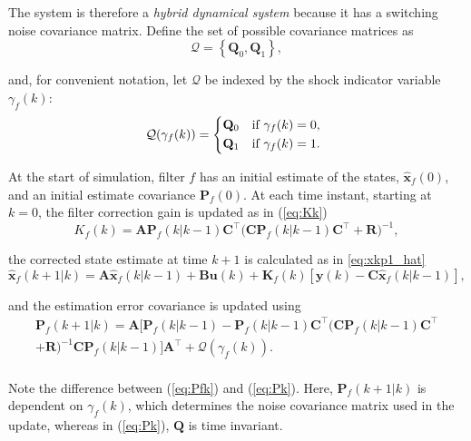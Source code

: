 The system is therefore a \textit{hybrid dynamical system} because it has a switching noise covariance matrix. Define the set of possible covariance matrices as
\begin{equation} \label{eq:init_Q_R}
	\mathcal{Q} = \left\{\mathbf{Q}_0, \mathbf{Q}_1\right\},
\end{equation}

and, for convenient notation, let $\mathcal{Q}$ be indexed by the shock indicator variable $\gamma_f(k)$:
\begin{equation} \label{eq:init_Q}
	\mathcal{Q}(\gamma_f(k)) = 
	\begin{cases*}
		\mathbf{Q}_0 & \text{if} $\gamma_f(k)=0$, \\
		\mathbf{Q}_1 & \text{if} $\gamma_f(k)=1$.
	\end{cases*}
\end{equation}

At the start of simulation, filter $f$ has an initial estimate of the states, $\mathbf{\hat{x}}_f(0)$, and an initial estimate covariance $\mathbf{P}_f(0)$. At each time instant, starting at $k=0$, the filter correction gain is updated as in (\ref{eq:Kk})
\begin{equation} \label{eq:Kf}
	K_f(k) = \mathbf{A}\mathbf{P}_f(k|k-1)\mathbf{C}^\intercal \big(\mathbf{C}\mathbf{P}_f(k|k-1)\mathbf{C}^\intercal + \mathbf{R}\big)^{-1},
\end{equation}

the corrected state estimate at time $k+1$ is calculated as in \ref{eq:xkp1_hat}
\begin{equation} \label{eq:xfkp1_hat}
	\mathbf{\hat{x}}_f(k+1|k) = \mathbf{A} \mathbf{\hat{x}}_f(k|k-1) + \mathbf{B}\mathbf{u}(k) + 
	\mathbf{K}_f(k)\left[\mathbf{y}(k)-\mathbf{C} \mathbf{\hat{x}}_f(k|k-1)\right],
\end{equation}

and the estimation error covariance is updated using
\begin{multline} \label{eq:Pfk}
	\mathbf{P}_f(k+1|k) = \mathbf{A}\big[\mathbf{P}_f(k|k-1)
	- \mathbf{P}_f(k|k-1)\mathbf{C}^\intercal\big(\mathbf{C}\mathbf{P}_f(k|k-1)\mathbf{C}^\intercal \\ + 
	\mathbf{R}\big)^{-1}\mathbf{C}\mathbf{P}_f(k|k-1) \big]\mathbf{A}^\intercal + \mathcal{Q}(\gamma_f(k)). \\
\end{multline}

Note the difference between (\ref{eq:Pfk}) and (\ref{eq:Pk}).  Here, $\mathbf{P}_f(k+1|k)$ is dependent on $\gamma_f(k)$, which determines the noise covariance matrix used in the update, whereas in (\ref{eq:Pk}), $\mathbf{Q}$ is time invariant.

